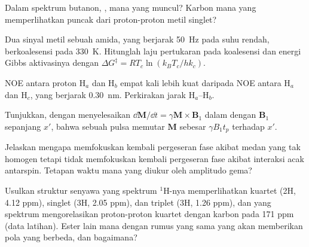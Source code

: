 \begin{exercise}[$\star\star$]\label{exo:b3:advanced-nmr:7}
Dalam spektrum  butanon, ,  mana yang
muncul? Karbon mana yang memperlihatkan puncak  dari proton-proton metil
singlet?
\end{exercise}

\begin{exercise}[$\star\star$]\label{exo:b3:advanced-nmr:8}
Dua sinyal metil sebuah amida, yang berjarak \qty{50}{Hz} pada suhu rendah,
berkoalesensi pada \qty{330}{K}. Hitunglah laju pertukaran pada koalesensi dan
energi Gibbs aktivasinya dengan $\Delta G^\ddagger = RT_c\ln(k_BT_c/hk_c)$.
\end{exercise}

\begin{exercise}[$\star\star$]\label{exo:b3:advanced-nmr:9}
NOE antara proton H$_a$ dan H$_b$ empat kali lebih kuat daripada NOE antara
H$_a$ dan H$_c$, yang berjarak \qty{0.30}{nm}. Perkirakan jarak H$_a$--H$_b$.
\end{exercise}

\begin{exercise}[$\star\star\star$]\label{exo:b3:advanced-nmr:10}
Tunjukkan, dengan menyelesaikan $\dd\mathbf M/\dd t = \gamma\mathbf M\times\mathbf B_1$
dalam  dengan $\mathbf B_1$ sepanjang $x'$, bahwa sebuah pulsa
memutar $\mathbf M$ sebesar $\gamma B_1t_p$ terhadap $x'$.
\end{exercise}

\begin{exercise}[$\star\star\star$]\label{exo:b3:advanced-nmr:11}
Jelaskan mengapa  memfokuskan kembali pergeseran fase akibat medan
yang tak homogen tetapi tidak memfokuskan kembali pergeseran fase akibat
interaksi acak antarspin. Tetapan waktu mana yang diukur oleh amplitudo gema?
\end{exercise}

\begin{exercise}[$\star\star\star$]\label{exo:b3:advanced-nmr:12}
Usulkan struktur senyawa  yang spektrum ${}^1$H-nya memperlihatkan
kuartet (2H, 4.12 ppm), singlet (3H, 2.05 ppm), dan triplet (3H,
1.26 ppm), dan yang spektrum  mengorelasikan proton-proton kuartet
dengan karbon pada 171 ppm (data latihan). Ester lain mana dengan rumus yang
sama yang akan memberikan pola  yang berbeda, dan bagaimana?
\end{exercise}

